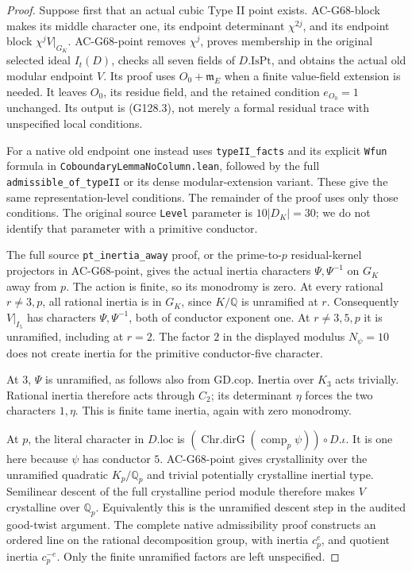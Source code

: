 \begin{proof}
Suppose first that an actual cubic Type II point exists.
AC-G68-block makes its middle character one, its endpoint
determinant \(\chi^{2j}\), and its endpoint block
\(\chi^jV|_{G_K}\).  AC-G68-point removes \(\chi^j\), proves
membership in the original selected ideal \(I_t(D)\), checks all
seven fields of \(D.\mathrm{IsPt}\), and obtains the actual old
modular endpoint \(V\).  Its proof uses \(O_0+\mathfrak m_E\)
when a finite value-field extension is needed.  It leaves
\(O_0\), its residue field, and the retained condition \(e_{O_0}=1\)
unchanged.  Its output is (G128.3), not merely a formal residual
trace with unspecified local conditions.

For a native old endpoint one instead uses
\texttt{typeII\_facts} and its explicit \texttt{Wfun} formula in
\texttt{CoboundaryLemmaNoColumn.lean}, followed by the full
\texttt{admissible\_of\_typeII} or its dense modular-extension
variant.  These give the same representation-level conditions.
The remainder of the proof uses only those conditions.
The original source \texttt{Level} parameter is \(10|D_K|=30\);
we do not identify that parameter with a primitive conductor.

The full source \texttt{pt\_inertia\_away} proof, or the
prime-to-\(p\) residual-kernel projectors in AC-G68-point, gives
the actual inertia characters \(\Psi,\Psi^{-1}\) on \(G_K\)
away from \(p\).  The action is finite, so its monodromy is zero.
At every rational \(r\ne3,p\), all rational inertia is in
\(G_K\), since \(K/\mathbb Q\) is unramified at \(r\).
Consequently \(V|_{I_5}\) has characters
\(\Psi,\Psi^{-1}\), both of conductor exponent one.  At
\(r\ne3,5,p\) it is unramified, including at \(r=2\).
The factor \(2\) in the displayed modulus \(N_\psi=10\)
does not create inertia for the primitive conductor-five character.

At \(3\), \(\Psi\) is unramified, as follows also from
\(\mathrm{GD.cop}\).  Inertia over \(K_3\) acts trivially.
Rational inertia therefore acts through \(C_2\); its determinant
\(\eta\) forces the two characters \(1,\eta\).  This is finite
tame inertia, again with zero monodromy.

At \(p\), the literal character in \(D.\mathrm{loc}\) is
\((\operatorname{Chr.dirG}(\operatorname{comp}_p\psi))\circ D.\iota\).
It is one here because \(\psi\) has conductor \(5\).
AC-G68-point gives crystallinity over the unramified quadratic
\(K_p/\mathbb Q_p\) and trivial potentially crystalline inertial
type.  Semilinear descent of the full crystalline period module
therefore makes \(V\) crystalline over \(\mathbb Q_p\).
Equivalently this is the unramified descent step in the audited
good-twist argument.  The complete native admissibility proof
constructs an ordered line on the rational decomposition group,
with inertia \(c_p^e\), and quotient inertia \(c_p^{-e}\).
Only the finite unramified factors are left unspecified.


\end{proof}
